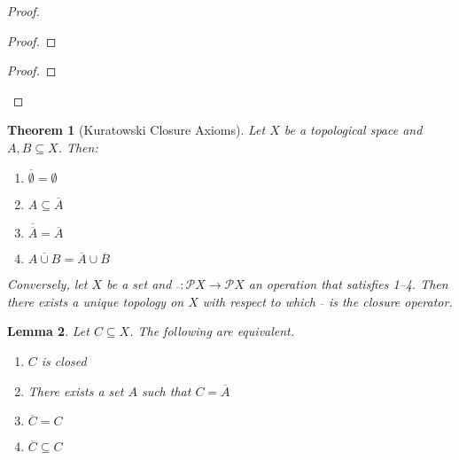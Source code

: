 \documentclass{book}
\newtheorem{lm}{Lemma}[chapter]
\newtheorem{thm}[lm]{Theorem}
\theoremstyle{definition}
\begin{document}
  \begin{proof}
    \begin{proof}
    \end{proof}
    \begin{proof}
    \end{proof}
  \end{proof}
  
  \begin{thm}[Kuratowski Closure Axioms]
    Let $X$ be a topological space and $A, B \subseteq X$. Then:
    \begin{enumerate}
      \item $\overline{\emptyset} = \emptyset$
      \item $A \subseteq \overline{A}$
      \item $\overline{\overline{A}} = \overline{A}$
      \item $\overline{A \cup B} = \overline{A} \cup \overline{B}$
    \end{enumerate}
    
    Conversely, let $X$ be a set and $\overline{\ } : \mathcal{P} X \rightarrow 
    \mathcal{P} X$ an operation that satisfies 1--4. Then there exists a unique
    topology on $X$ with respect to which $\overline{ }$ is the closure 
    operator.
  \end{thm}
  
  \begin{lm}
    \label{lm:topology:closure:closed}
    Let $C \subseteq X$. The following are equivalent.
    \begin{enumerate}
      \item $C$ is closed
      \item There exists a set $A$ such that $C = \overline{A}$
      \item $\overline{C} = C$
      \item $\overline{C} \subseteq C$
    \end{enumerate}
  \end{lm}
  
\end{document}
